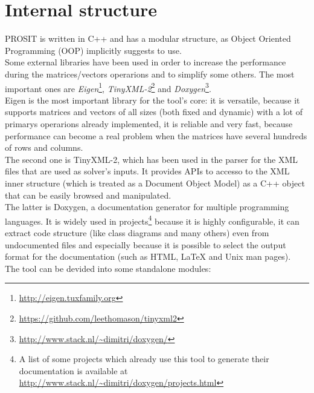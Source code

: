 \section{Internal structure}\label{structure}
PROSIT is written in C++ and has a modular structure, as Object Oriented Programming (OOP) implicitly suggests to use.\\
Some external libraries have been used in order to increase the performance during the matrices/vectors operarions and to simplify some others. The most important ones are \emph{Eigen}\footnote{\url{http://eigen.tuxfamily.org}}, \emph{TinyXML-2}\footnote{\url{https://github.com/leethomason/tinyxml2}} and \emph{Doxygen}\footnote{\url{http://www.stack.nl/~dimitri/doxygen/}}.\\   
Eigen is the most important library for the tool's core: it is versatile, because it supports matrices and vectors of all sizes (both fixed and dynamic) with a lot of primarys operarions already implemented, it is reliable and very fast, because performance can become a real problem when the matrices have several hundreds of rows and columns.\\
The second one is TinyXML-2, which has been used in the parser for the XML files that are used as solver's inputs. It provides APIs to accesso to the XML inner structure (which is treated as a Document Object Model) as a C++ object that can be easily browsed and manipulated.\\
The latter is Doxygen, a documentation generator for multiple programming languages. It is widely used in projects\footnote{A list of some projects which already use this tool to generate their documentation is available at \url{http://www.stack.nl/~dimitri/doxygen/projects.html}} because it is highly configurable, it can extract code structure (like class diagrams and many others) even from undocumented files and especially because it is possible to select the output format for the documentation (such as HTML, {\LaTeX} and Unix man pages).\\
The tool can be devided into some standalone modules:
